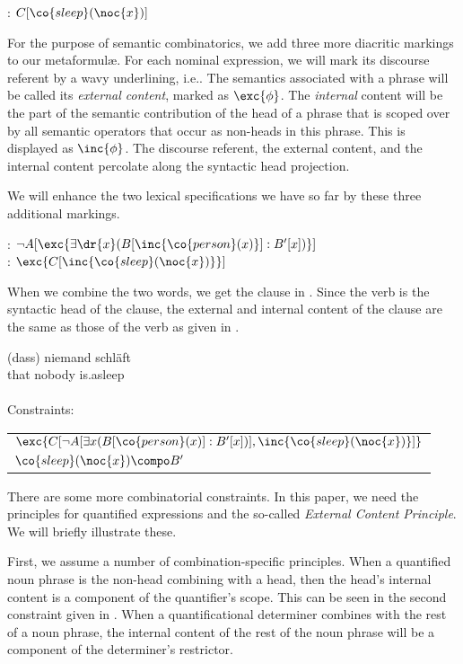 \documentclass[output=paper]{langsci/langscibook}
\begin{document}
\ea \label{le-schlaeft}
 : $C[\co{sleep}(\noc{x})]$
\z 

For the purpose of semantic combinatorics, we add three more diacritic markings to our metaformul\ae. 
For each nominal expression, we will mark its discourse referent by a wavy underlining, 
i.e.\@ {}. 
The semantics associated with a phrase will be called its \emph{external content}, marked as $\exc{\phi}$. The \emph{internal} content will be the part of the semantic contribution of the head of a phrase 
that is scoped over by all semantic operators that occur as non-heads in this phrase. 
This 
is displayed as $\inc{\phi}$. The discourse referent, the external content, and the internal content percolate along the syntactic head projection.

We will enhance the two lexical specifications we have so far by these three additional markings.

\ea \label{le-niemand-schlaeft-diacritic}
: $\lnot A[\exc{\exists \dr{x} (B[\inc{\co{person}(x)}] : B'[x])}]$\\
: $\exc{C[\inc{\co{sleep}(\noc{x})}}]$
\z


When we combine the two words, we get the clause in . Since the verb is the syntactic head of the clause, the external and internal content of the clause are the same as those of the verb as given in .

\ea \label{niemand-schlaeft}
\gll (dass) niemand schläft\\
that nobody is.asleep\\
\glt {}\\
Constraints: \begin{tabular}[t]{l}
$\exc{C[\lnot A[\exists x (B[\co{person}(x)] : B'[x])], \inc{\co{sleep}(\noc{x})}]}$\\
$\co{sleep}(\noc{x}) \compo B'$
\end{tabular}
\z 

There are some more combinatorial constraints. In this paper, we need the principles for quantified expressions and the so-called \emph{External Content Principle}. We will briefly illustrate these.

First, we assume a number of combination-specific principles. When a quantified noun phrase is the non-head combining  with a head, then the head's internal content is a component of the quantifier's scope. This can be seen in the second constraint given in . When a quantificational determiner combines with the rest of a noun phrase, the internal content of the rest of the noun phrase will be a component of the determiner's restrictor.
\end{document}
